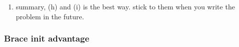 \documentclass[a4paper,12pt,twoside]{book}
\begin{document}
\begin{itemize}
\begin{enumerate}
\begin{lstlisting}[frame=single, language=c++,mathescape=true]
auto w = TestOverload{2} //test for (i)
//1) you can use auto w = TestOverload(2), it just call ctor, and w is not const reference.
//2) {} is better, it more generic and avoid narrow auto w = TestOverload{1.2} fail, but auto w = TestOverload(1.2) succeed. 
//3) even converting ctor is explict, it can work too.
//4) don't call copy ctor at all
\end{lstlisting}

		\item summary, (h) and (i) is the best way. stick to them when you write the problem in the future. 
	\end{enumerate}

\end{itemize}

\subsubsection{Brace init advantage}
\end{document}
